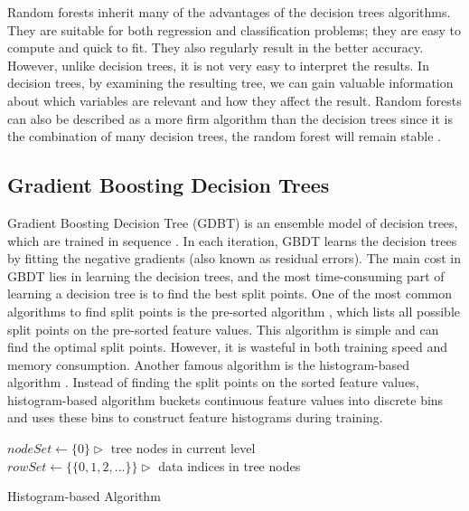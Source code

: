 Random forests inherit many of the advantages of the decision trees algorithms. They are suitable for both regression and classification problems; they are easy to compute and quick to fit. They also regularly result in the better accuracy. However, unlike decision trees, it is not very easy to interpret the results. In decision trees, by examining the resulting tree, we can gain valuable information about which variables are relevant and how they affect the result. Random forests can also be described as a more firm algorithm than the decision trees since it is the combination of many decision trees, the random forest will remain stable \cite{louppe2014understanding}.

\subsection{Gradient Boosting Decision Trees}
\label{ssec:gbdt}

Gradient Boosting Decision Tree (GDBT) is an ensemble model of decision trees, which are trained in sequence \cite{friedman2001greedy}. 
In each iteration, GBDT learns the decision trees by fitting the negative gradients (also known as residual errors).
The main cost in GBDT lies in learning the decision trees, and the most time-consuming part of learning a decision tree is to find the best split points.
One of the most common algorithms to find split points is the pre-sorted algorithm \cite{mehta1996sliq, shafer1996sprint}, which lists all possible split points on the pre-sorted feature values. 
This algorithm is simple and can find the optimal split points.
However, it is wasteful in both training speed and memory consumption. Another famous algorithm is the histogram-based
algorithm \cite{ranka1998clouds, jin2003communication, li2008mcrank}. 
Instead of finding the split points on the sorted feature values, histogram-based algorithm buckets continuous feature values into discrete bins and uses these bins to construct feature histograms during training.

\bigskip
\begin{algorithm}[H]
 $nodeSet \leftarrow \{0\} \triangleright$ tree nodes in current level \\
 $rowSet \leftarrow \{\{0, 1, 2, ...\}\} \triangleright$ data indices in tree nodes \\
 \caption{Histogram-based Algorithm}
 \label{alg:histogram-based}
\end{algorithm}
\bigskip

